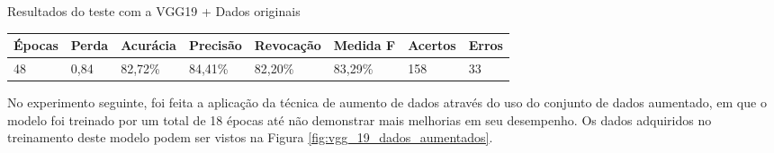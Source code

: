 \documentclass[
	12pt,				%
	oneside,			%
	a4paper,			%
	english,			%
	brazil				%
	]{abntex2ppgsi}
\begin{document}
\begin{quadro}[H]
\caption{Resultados do teste com a VGG19 + Dados originais}
\label{quad:resultados_teste_vgg_19_com_dados_originais}
\centering
\begin{tabular}{|l|l|l|l|l|l|l|l|}
\cline{1-8}
Épocas & Perda & Acurácia & Precisão & Revocação & Medida F & Acertos & Erros \\ \hline
48 & 0,84 & 82,72\% & 84,41\% & 82,20\% & 83,29\% & 158 & 33 \\
\cline{1-8}
\end{tabular}
\end{quadro}

No experimento seguinte, foi feita a aplicação da técnica de aumento de dados através do uso do conjunto de dados aumentado, em que o modelo foi treinado por um total de 18 épocas até não demonstrar mais melhorias em seu desempenho. Os dados adquiridos no treinamento deste modelo podem ser vistos na Figura \ref{fig:vgg_19_dados_aumentados}.
\end{document}
